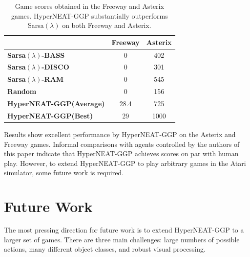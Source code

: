 \documentclass{sig-alternate}
\begin{document}

\begin{table}
\begin{center}
\begin{tabular}{|l|c|c|}
\hline
~ & \textbf{Freeway} & \textbf{Asterix} \\ \hline
\textbf{Sarsa$(\lambda)$-BASS} & 0 & 402 \\ \hline
\textbf{Sarsa$(\lambda)$-DISCO} & 0 & 301 \\ \hline
\textbf{Sarsa$(\lambda)$-RAM} & 0 & 545 \\ \hline
\textbf{Random} & 0 & 156 \\ \hline
\textbf{HyperNEAT-GGP(Average)} & 28.4 & 725 \\ \hline
\textbf{HyperNEAT-GGP(Best)} & 29 & 1000 \\ 
\hline
\end{tabular}
\end{center}
\label{tab:results-table}
\caption{Game scores obtained in the Freeway and Asterix games. HyperNEAT-GGP substantially outperforms Sarsa$(\lambda)$ on both Freeway and Asterix.}
\end{table}

Results show excellent performance by HyperNEAT-GGP on the Asterix and Freeway games. Informal comparisons with agents controlled by the authors of this paper indicate that HyperNEAT-GGP achieves scores on par with human play. However, to extend HyperNEAT-GGP to play arbitrary games in the Atari simulator, some future work is required.

\section{Future Work}
\label{sec:futurework}
The most pressing direction for future work is to extend HyperNEAT-GGP to a larger set of games. There are three main challenges: large numbers of possible actions, many different object classes, and robust visual processing.
\end{document}
